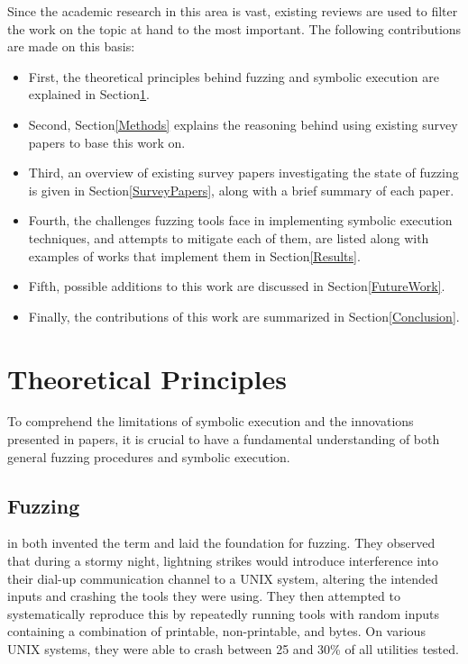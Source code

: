 \documentclass{article}
\begin{document}
\begin{multicols}{2}
    Since the academic research in this area is vast, existing reviews are used to filter the work on the topic at hand to the most important. The following contributions are made on this basis:

    \begin{itemize}
        \item First, the theoretical principles behind fuzzing and symbolic execution are explained in Section\ref{Theory}.
        \item Second, Section\ref{Methods} explains the reasoning behind using existing survey papers to base this work on.
        \item Third, an overview of existing survey papers investigating the state of fuzzing is given in Section\ref{SurveyPapers}, along with a brief summary of each paper.
        \item Fourth, the challenges fuzzing tools face in implementing symbolic execution techniques, and attempts to mitigate each of them, are listed along with examples of works that implement them in Section\ref{Results}.
        \item Fifth, possible additions to this work are discussed in Section\ref{FutureWork}.
        \item Finally, the contributions of this work are summarized in Section\ref{Conclusion}.
    \end{itemize}

    \section{Theoretical Principles}
    \label{Theory}

    To comprehend the limitations of symbolic execution and the innovations presented in papers, it is crucial to have a fundamental understanding of both general fuzzing procedures and symbolic execution.

    \subsection{Fuzzing}

    \citeauthor{UNIX} in \citeyear{UNIX} both invented the term and laid the foundation for fuzzing. They observed that during a stormy night, lightning strikes would introduce interference into their dial-up communication channel to a UNIX system, altering the intended inputs and crashing the tools they were using. They then attempted to systematically reproduce this by repeatedly running tools with random inputs containing a combination of printable, non-printable, and  bytes. On various UNIX systems, they were able to crash between 25 and 30\% of all utilities tested.\cite{UNIX}


\end{multicols}
\end{document}
